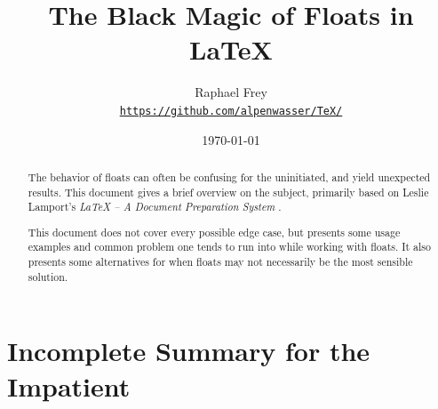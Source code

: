 \documentclass[article,a4paper,oneside,10pt]{memoir}
\title{\textsf{\Huge  The Black Magic of Floats in \LaTeX}}
\author{Raphael Frey\\[2mm]\small%
    \href{https://github.com/alpenwasser/TeX/tree/master/floats}
         {\nolinkurl{https://github.com/alpenwasser/TeX/}}}
\date{\vspace{1em}\today}
\newcommand\code[1]{\texttt{#1}}
\begin{document}


\maketitle

\vfill
\begin{abstract}
    The behavior  of floats can  often be  confusing for the  uninitiated, and
    yield  unexpected results. This  document gives  a brief  overview on  the
    subject, primarily based on Leslie  Lamport's \emph{\LaTeX{} -- A Document
    Preparation System} \cite{lamport}.

    This document does  not cover every possible edge case,  but presents some
    usage examples and common problem one tends to run into while working with
    floats.   It also  presents  some  alternatives for  when  floats may  not
    necessarily be the most sensible solution.
\end{abstract}

\vfill
\tableofcontents*
\vfill
\newpage
\listoflistings*
\label{lol}
\listoffigures*
\listoftables*


\newpage
\chapter{Incomplete Summary for the Impatient}
\label{chap:summary}

\vfill
{}
\end{document}
